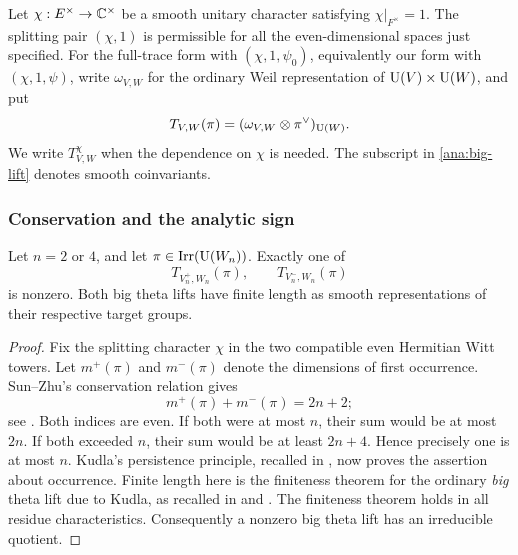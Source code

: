 Let $\chi:E^\times\to\mathbb C^\times$ be a smooth unitary character satisfying
$\chi|_{F^\times}=1$. The splitting pair $(\chi,1)$ is permissible
for all the even-dimensional spaces just specified. For the full-trace
form with $(\chi,1,\psi_0)$, equivalently our form with
$(\chi,1,\psi)$, write $\omega_{V,W}$ for the ordinary Weil
representation of $\operatorname{U}(V)\times\operatorname{U}(W)$, and put
\begin{equation}\label{ana:big-lift}
 T_{V,W}(\pi)
    =(\omega_{V,W}\otimes\pi^\vee)_{\operatorname{U}(W)}.
\end{equation}
We write $T^\chi_{V,W}$ when the dependence on $\chi$ is needed.
The subscript in \eqref{ana:big-lift} denotes smooth coinvariants.

\subsubsection{Conservation and the analytic sign}

\begin{theorem}
\label{ana:dichotomy}
Let $n=2$ or $4$, and let $\pi\in\operatorname{Irr}(\operatorname{U}(W_n))$.
Exactly one of
\[
 T_{V_n^+,W_n}(\pi),\qquad T_{V_n^-,W_n}(\pi)
\]
is nonzero. Both big theta lifts have finite length as smooth
representations of their respective target groups.
\end{theorem}

\begin{proof}
Fix the splitting character $\chi$ in the two compatible even
Hermitian Witt towers. Let $m^+(\pi)$ and $m^-(\pi)$ denote the
dimensions of first occurrence. Sun--Zhu's conservation relation gives
\[
 m^+(\pi)+m^-(\pi)=2n+2;
\]
see \cite[Theorem~1.10 and Proposition~1.6]{SunZhu}.
Both indices are even. If both were at most $n$, their sum would be
at most $2n$. If both exceeded $n$, their sum would be at least
$2n+4$. Hence precisely one is at most $n$. Kudla's persistence
principle, recalled in \cite[\S1.5]{SunZhu}, now proves the assertion
about occurrence. 
Finite length here is the finiteness theorem for the ordinary
\emph{big} theta lift due to Kudla, as recalled in
\cite[Introduction]{GanTakeda} and \cite[\S4.2]{GanIchino}.
The finiteness theorem holds in all residue characteristics.
Consequently a nonzero big theta lift has an irreducible quotient. \end{proof}

